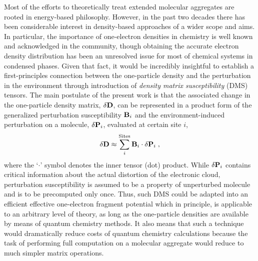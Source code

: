 \documentclass[aip,jcp,preprint,amsmath,amssymb,floatfix]{revtex4-1}
\begin{document}
Most of the efforts to theoretically treat extended molecular aggregates are rooted in energy\hyp{}based 
philosophy. However, in the past two decades there has been considerable interest in density\hyp{}based approaches
of a wider scope and aims.\cite{Yang.Lee.JCP.1995,
Mukamel.Berman.JCP.2003,
Piquemal.Cisneros.Reinhardt.Gresh.Darden.JCP.2006,
Elliott.Burke.Cohen.Wasserman.PhysRevA.2010,
Mandado.Hermida-Ramon.JCTC.2011,Sun.Chan.ACR.2016,Hedegard.Reiher.JCTC.2016} 
In particular, the importance of one\hyp{}electron densities in chemistry is well known and acknowledged 
in the community,\cite{Holas.March.PhysRevA.1991,Yang.PhysRevLett.1991,Yang.Lee.JCP.1995} 
though obtaining the accurate electron density distribution 
has been an unresolved issue for most of chemical systems in condensed phases. Given that fact, it would be 
incredibly insightful to establish a first\hyp{}principles connection between the one\hyp{}particle density 
and the perturbation in the environment through introduction of \emph{density matrix susceptibility} (DMS) tensors. 
The main postulate of the present work is that the associated change in the one\hyp{}particle density matrix, 
$\delta {\bf D}$, can be represented in a product form of the generalized perturbation susceptibility ${\bf B}_i$
and the environment\hyp{}induced perturbation on a molecule, $\delta {\bf P}_i$, evaluated at certain site $i$,
%
\begin{equation*} \label{e:initial-model}
  \delta {\bf D} \approx \sum_i^{\text{Sites}} {\bf B}_i
  \cdot  \delta {\bf P}_i \;,
\end{equation*}
%
where the `$\cdot$' symbol denotes the inner tensor (dot) product.
While $\delta {\bf P}_i$ contains critical information about the actual distortion of the electronic cloud,
perturbation susceptibility is assumed to be a property of unperturbed molecule and is to be precomputed only once. 
Thus, such DMS could be adapted into an efficient effective one\hyp{}electron fragment potential which in principle, 
is applicable to an arbitrary level of theory, as long as the one\hyp{}particle densities are available by means of
quantum chemistry methods. It also means that such a technique would dramatically reduce costs of quantum chemistry 
calculations because the task of performing full computation on a molecular aggregate would reduce to much simpler
matrix operations.
\end{document}

